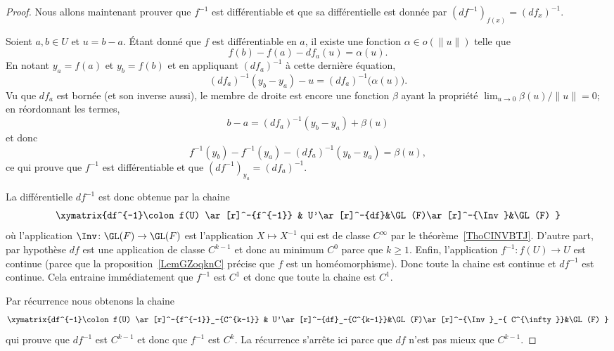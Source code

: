 \begin{proof}
    Nous allons maintenant prouver que \( f^{-1}\) est différentiable et que sa différentielle est donnée par \( (df^{-1})_{f(x)}=(df_x)^{-1}\).

    Soient \( a,b\in U\) et \( u=b-a\). Étant donné que \( f\) est différentiable en \( a\), il existe une fonction \( \alpha\in o(\| u \|)\) telle que
    \begin{equation}
        f(b)-f(a)-df_a(u)=\alpha(u).
    \end{equation}
    En notant \( y_a=f(a)\) et \( y_b=f(b)\) et en appliquant \( (df_a)^{-1}\) à cette dernière équation,
    \begin{equation}
        (df_a)^{-1}(y_b-y_a)-u=(df_a)^{-1} \big( \alpha(u) \big).
    \end{equation}
    Vu que \( df_a\) est bornée (et son inverse aussi), le membre de droite est encore une fonction \( \beta\) ayant la propriété \( \lim_{u\to 0}\beta(u)/\| u \|=0\); en réordonnant les termes,
    \begin{equation}
        b-a=(df_a)^{-1}(y_b-y_a)+\beta(u)
    \end{equation}
    et donc
    \begin{equation}
        f^{-1}(y_b)-f^{-1}(y_a)-(df_a)^{-1}(y_b-y_a)=\beta(u),
    \end{equation}
    ce qui prouve que \( f^{-1}\) est différentiable et que \( (df^{-1})_{y_a}=(df_a)^{-1}\).

    La différentielle \( df^{-1}\) est donc obtenue par la chaine
    \begin{equation}
    \xymatrix{%
        df^{-1}\colon f(U) \ar[r]^-{f^{-1}}     &   U'\ar[r]^-{df}&\GL(F)\ar[r]^-{\Inv}&\GL(F)
       }
    \end{equation}
    où l'application \( \Inv\colon \GL(F)\to \GL(F)\) est l'application \( X\mapsto X^{-1}\) qui est de classe \(  C^{\infty}\) par le théorème~\ref{ThoCINVBTJ}. D'autre part, par hypothèse \( df\) est une application de classe \( C^{k-1}\) et donc au minimum \( C^0\) parce que \( k\geq 1\). Enfin, l'application \( f^{-1}\colon f(U)\to U\) est continue (parce que la proposition~\ref{LemGZoqknC} précise que \( f\) est un homéomorphisme). Donc toute la chaine est continue et \( df^{-1}\) est continue. Cela entraine immédiatement que \( f^{-1}\) est \( C^1\) et donc que toute la chaine est \( C^1\).

    Par récurrence nous obtenons la chaine
    \begin{equation}
    \xymatrix{%
        df^{-1}\colon f(U) \ar[r]^-{f^{-1}}_-{C^{k-1}}     &   U'\ar[r]^-{df}_-{C^{k-1}}&\GL(F)\ar[r]^-{\Inv}_-{ C^{\infty}}&\GL(F)
       }
    \end{equation}
    qui prouve que \( df^{-1}\) est \( C^{k-1} \) et donc que \( f^{-1}\) est \( C^k\). La récurrence s'arrête ici parce que \( df\) n'est pas mieux que \( C^{k-1}\).
\end{proof}

